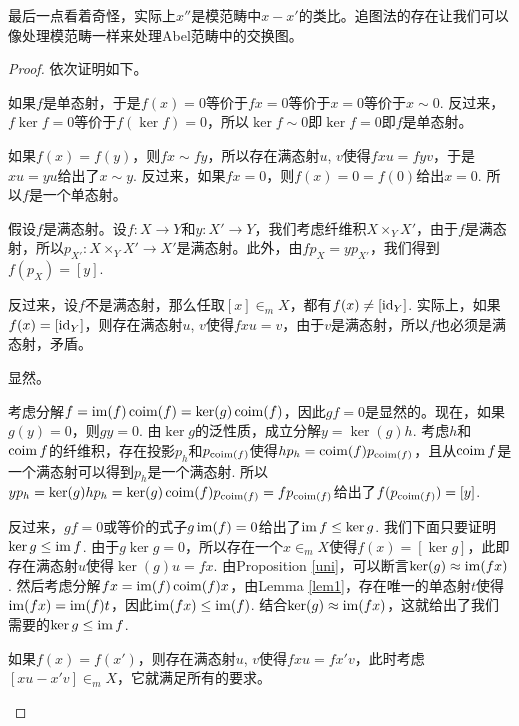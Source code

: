 最后一点看着奇怪，实际上$x''$是模范畴中$x-x'$的类比。追图法的存在让我们可以像处理模范畴一样来处理Abel范畴中的交换图。

\begin{proof}
依次证明如下。
\begin{compactenum}[~~~(1)]
\item 如果$f$是单态射，于是$f(x)=0$等价于$fx=0$等价于$x=0$等价于$x\sim 0$. 反过来，$f\ker f=0$等价于$f(\ker f)=0$，所以$\ker f\sim 0$即$\ker f=0$即$f$是单态射。

\item 如果$f(x)=f(y)$，则$fx\sim fy$，所以存在满态射$u$, $v$使得$fxu=fyv$，于是$xu=yu$给出了$x\sim y$. 反过来，如果$fx=0$，则$f(x)=0=f(0)$给出$x=0$. 所以$f$是一个单态射。

\item 假设$f$是满态射。设$f:X\to Y$和$y:X'\to Y$，我们考虑纤维积$X\times_Y X'$，由于$f$是满态射，所以$p_{X'}:X\times_Y X'\to X'$是满态射。此外，由$fp_X=yp_{X'}$，我们得到$f(p_X)=[y]$. 

反过来，设$f$不是满态射，那么任取$[x]\in_m X$，都有$f(x)\neq [\operatorname{id}_Y]$. 实际上，如果$f(x)=[\operatorname{id}_Y]$，则存在满态射$u$, $v$使得$fxu=v$，由于$v$是满态射，所以$f$也必须是满态射，矛盾。

\item 显然。

\item 考虑分解$f=\operatorname{im}(f)\operatorname{coim}(f)=\ker(g)\operatorname{coim}(f)$，因此$gf=0$是显然的。现在，如果$g(y)=0$，则$gy=0$. 由$\ker g$的泛性质，成立分解$y=\ker(g)h$. 考虑$h$和$\operatorname{coim} f$的纤维积，存在投影$p_h$和$p_{\operatorname{coim}(f)}$使得$hp_h=\operatorname{coim}(f)p_{\operatorname{coim}(f)}$，且从$\operatorname{coim} f$是一个满态射可以得到$p_h$是一个满态射. 所以$yp_h=\ker(g)hp_h=\ker(g)\operatorname{coim}(f)p_{\operatorname{coim}(f)}=fp_{\operatorname{coim}(f)}$给出了$f(p_{\operatorname{coim}(f)})=[y]$.

反过来，$gf=0$或等价的式子$g\operatorname{im}(f)=0$给出了$\operatorname{im} f \leq \ker g$. 我们下面只要证明$\ker g \leq \operatorname{im} f$. 由于$g\ker g=0$，所以存在一个$x\in_m X$使得$f(x)=[\ker g]$，此即存在满态射$u$使得$\ker(g)u=fx$. 由Proposition \ref{uni}，可以断言$\ker(g)\approx \operatorname{im}(fx)$. 然后考虑分解$fx=\operatorname{im}(f)\operatorname{coim}(f)x$，由Lemma \ref{lem1}，存在唯一的单态射$t$使得$\operatorname{im}(fx)=\operatorname{im}(f)t$，因此$\operatorname{im}(fx)\leq \operatorname{im}(f)$. 结合$\ker(g)\approx \operatorname{im}(fx)$，这就给出了我们需要的$\ker g\leq \operatorname{im} f$.

\item 如果$f(x)=f(x')$，则存在满态射$u$, $v$使得$fxu=fx'v$，此时考虑$[xu-x'v]\in_m X$，它就满足所有的要求。
\end{compactenum}
\end{proof}

